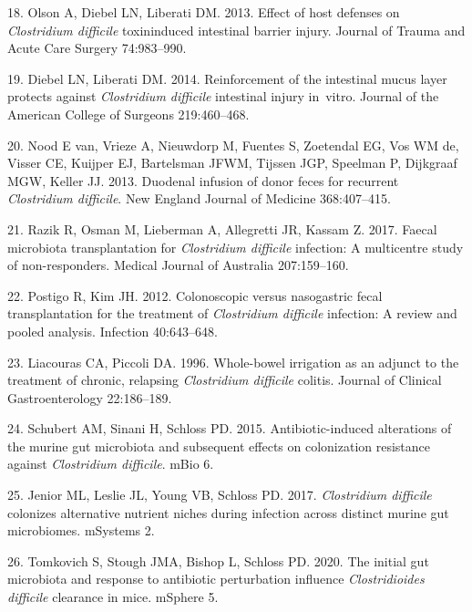 \documentclass[
  11pt,
]{article}
\begin{document}
\leavevmode\hypertarget{ref-Olson2013}{}%
18. Olson A, Diebel LN, Liberati DM. 2013. Effect of host defenses on
\emph{Clostridium difficile} toxininduced intestinal barrier injury.
Journal of Trauma and Acute Care Surgery 74:983--990.

\leavevmode\hypertarget{ref-Diebel2014}{}%
19. Diebel LN, Liberati DM. 2014. Reinforcement of the intestinal mucus
layer protects against \emph{Clostridium difficile} intestinal injury
in~vitro. Journal of the American College of Surgeons 219:460--468.

\leavevmode\hypertarget{ref-vanNood2013}{}%
20. Nood E van, Vrieze A, Nieuwdorp M, Fuentes S, Zoetendal EG, Vos WM
de, Visser CE, Kuijper EJ, Bartelsman JFWM, Tijssen JGP, Speelman P,
Dijkgraaf MGW, Keller JJ. 2013. Duodenal infusion of donor feces for
recurrent \emph{Clostridium difficile}. New England Journal of Medicine
368:407--415.

\leavevmode\hypertarget{ref-Razik2017}{}%
21. Razik R, Osman M, Lieberman A, Allegretti JR, Kassam Z. 2017. Faecal
microbiota transplantation for \emph{Clostridium difficile} infection: A
multicentre study of non-responders. Medical Journal of Australia
207:159--160.

\leavevmode\hypertarget{ref-Postigo2012}{}%
22. Postigo R, Kim JH. 2012. Colonoscopic versus nasogastric fecal
transplantation for the treatment of \emph{Clostridium difficile}
infection: A review and pooled analysis. Infection 40:643--648.

\leavevmode\hypertarget{ref-Liacouras1996}{}%
23. Liacouras CA, Piccoli DA. 1996. Whole-bowel irrigation as an adjunct
to the treatment of chronic, relapsing \emph{Clostridium difficile}
colitis. Journal of Clinical Gastroenterology 22:186--189.

\leavevmode\hypertarget{ref-Schubert2015}{}%
24. Schubert AM, Sinani H, Schloss PD. 2015. Antibiotic-induced
alterations of the murine gut microbiota and subsequent effects on
colonization resistance against \emph{Clostridium difficile}. mBio 6.

\leavevmode\hypertarget{ref-Jenior2017}{}%
25. Jenior ML, Leslie JL, Young VB, Schloss PD. 2017. \emph{Clostridium
difficile} colonizes alternative nutrient niches during infection across
distinct murine gut microbiomes. mSystems 2.

\leavevmode\hypertarget{ref-Tomkovich2020}{}%
26. Tomkovich S, Stough JMA, Bishop L, Schloss PD. 2020. The initial gut
microbiota and response to antibiotic perturbation influence
\emph{Clostridioides difficile} clearance in mice. mSphere 5.
\end{document}
